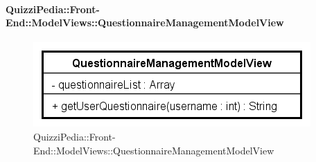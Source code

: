 \paragraph[QuizziPedia::Front-End::ModelViews\\::QuestionnaireManagementModelView]{QuizziPedia::Front-End::ModelViews::QuestionnaireManagementModelView}
	
	\label{QuizziPedia::Front-End::ModelViews::QuestionnaireManagementModelView}
	
	\begin{figure}[ht]
		\centering
		\includegraphics[scale=0.8,keepaspectratio]{UML/Classi/Front-End/QuizziPedia_Front-end_ModelView_QuestionnaireManagementModelView.png}
		\caption{QuizziPedia::Front-End::ModelViews::QuestionnaireManagementModelView}
	\end{figure} \FloatBarrier
	
